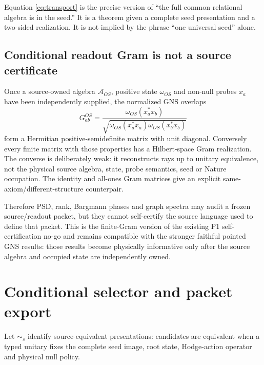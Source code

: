 \documentclass[11pt,a4paper]{article}
\theoremstyle{remark}
\begin{document}
Equation \eqref{eq:transport} is the precise version of ``the full common
relational algebra is in the seed.''  It is a theorem given a complete seed
presentation and a two-sided realization.  It is not implied by the phrase
``one universal seed'' alone.

\subsection*{Conditional readout Gram is not a source certificate}
Once a source-owned algebra $\mathcal A_{OS}$, positive state $\omega_{OS}$
and non-null probes $x_a$ have been independently supplied, the normalized
GNS overlaps
\[
 G^{OS}_{ab}=
 \frac{\omega_{OS}(x_a^*x_b)}
 {\sqrt{\omega_{OS}(x_a^*x_a)\omega_{OS}(x_b^*x_b)}}
\]
form a Hermitian positive-semidefinite matrix with unit diagonal.  Conversely
every finite matrix with those properties has a Hilbert-space Gram
realization.  The converse is deliberately weak: it reconstructs rays up to
unitary equivalence, not the physical source algebra, state, probe semantics,
seed or Nature occupation.  The identity and all-ones Gram matrices give an
explicit same-axiom/different-structure counterpair.

Therefore PSD, rank, Bargmann phases and graph spectra may audit a frozen
source/readout packet, but they cannot self-certify the source language used
to define that packet.  This is the finite-Gram version of the existing P1
self-certification no-go and remains compatible with the stronger faithful
pointed GNS results: those results become physically informative only after
the source algebra and occupied state are independently owned.

\section{Conditional selector and packet export}

Let $\sim_s$ identify source-equivalent presentations: candidates are
equivalent when a typed unitary fixes the complete seed image, root state,
Hodge-action operator and physical null policy.
\end{document}
